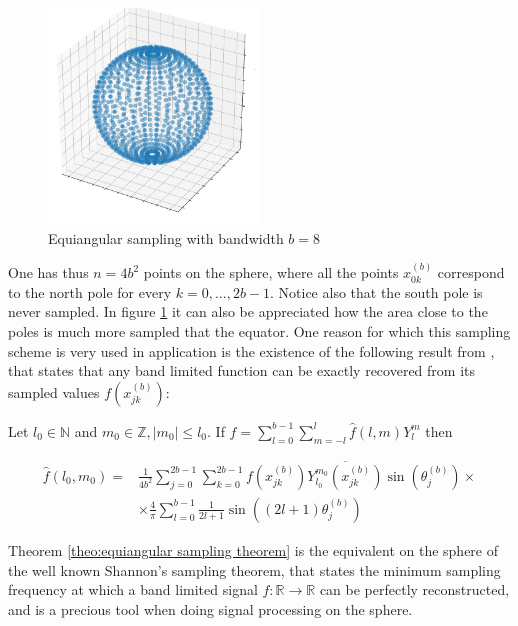 \begin{figure}[h]
	\centering
	\includegraphics[width=0.5\textwidth]{figs/Chapter3/equiangular.png}
	\caption{\label{fig:equiangular sampling}Equiangular sampling with bandwidth $b=8$}
\end{figure}
One has thus $n=4b^2$ points on the sphere, where all the points $x_{0 k}^{(b)}$ correspond to the north pole for every $k=0, ..., 2b-1$. Notice also that the south pole is never sampled. In figure \ref{fig:equiangular sampling} it can also be appreciated how the area close to the poles is much more sampled that the equator. One reason for which this sampling scheme is very used in application is the existence of the following result from \cite{Driscoll:1994:CFT:184069.184073}, that states that any band limited function can be exactly recovered from its sampled values $f\left(x_{j k}^{(b)}\right)$:
\vspace{0.5cm}
\begin{theorem}\label{theo:equiangular sampling theorem}
	Let \(l_{0} \in \mathbb{N}\) and \(m_{0} \in \mathbb{Z},\left|m_{0}\right| \leq l_{0} .\) If \(f=\sum_{l=0}^{b-1} \sum_{m=-l}^{l} \widehat{f}(l, m) Y_{l}^{m}\)
	then
	
	$$
	\begin{aligned} \widehat{f}\left(l_{0}, m_{0}\right)=& \frac{1}{4 b^{2}} \sum_{j=0}^{2 b-1} \sum_{k=0}^{2 b-1} f\left(x_{j k}^{(b)}\right) \overline{Y_{l_{0}}^{m_{0}}\left(x_{j k}^{(b)}\right)} \sin \left(\theta_{j}^{(b)}\right) \times \\ & \times \frac{4}{\pi} \sum_{l=0}^{b-1} \frac{1}{2 l+1} \sin \left((2 l+1) \theta_{j}^{(b)}\right) \end{aligned}
	$$
\end{theorem}
\vspace{0.5cm}
Theorem \ref{theo:equiangular sampling theorem} is the equivalent on the sphere of the well known Shannon's sampling theorem, that states the minimum sampling frequency at which a band limited signal $f:\mathbb R \to \mathbb R$ can be perfectly reconstructed, and is a precious tool when doing signal processing on the sphere.

